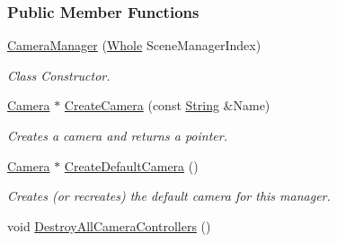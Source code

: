 \subsubsection*{Public Member Functions}
\begin{DoxyCompactItemize}
\item 
\hyperlink{classMezzanine_1_1CameraManager_a2beb54ad16ce87e9febc941818384b8e}{CameraManager} (\hyperlink{namespaceMezzanine_adcbb6ce6d1eb4379d109e51171e2e493}{Whole} SceneManagerIndex)
\begin{DoxyCompactList}\small\item\em Class Constructor. \item\end{DoxyCompactList}\item 
\hyperlink{classMezzanine_1_1Camera}{Camera} $\ast$ \hyperlink{classMezzanine_1_1CameraManager_a4e97870f483d294683c508c04b41ac9c}{CreateCamera} (const \hyperlink{namespaceMezzanine_acf9fcc130e6ebf08e3d8491aebcf1c86}{String} \&Name)
\begin{DoxyCompactList}\small\item\em Creates a camera and returns a pointer. \item\end{DoxyCompactList}\item 
\hyperlink{classMezzanine_1_1Camera}{Camera} $\ast$ \hyperlink{classMezzanine_1_1CameraManager_a59b4343ed87c095cca6cb529d27babcc}{CreateDefaultCamera} ()
\begin{DoxyCompactList}\small\item\em Creates (or recreates) the default camera for this manager. \item\end{DoxyCompactList}\item 
\hypertarget{classMezzanine_1_1CameraManager_a1e0ef1d314efc126b8149ec713d0a27e}{
void \hyperlink{classMezzanine_1_1CameraManager_a1e0ef1d314efc126b8149ec713d0a27e}{DestroyAllCameraControllers} ()}
\label{classMezzanine_1_1CameraManager_a1e0ef1d314efc126b8149ec713d0a27e}


\end{DoxyCompactItemize}
